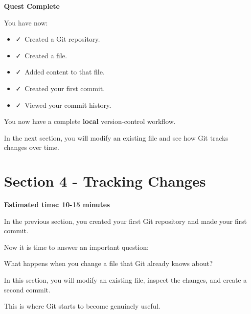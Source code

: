 \documentclass{csc2059practical}
\begin{document}
\begin{wrapupbox}
\textbf{Quest Complete}\par
\medskip

You have now:


\begin{itemize}
  \item \faCheck\ Created a Git repository.
\end{itemize}

\begin{itemize}
  \item \faCheck\ Created a file.
\end{itemize}

\begin{itemize}
  \item \faCheck\ Added content to that file.
\end{itemize}

\begin{itemize}
  \item \faCheck\ Created your first commit.
\end{itemize}

\begin{itemize}
  \item \faCheck\ Viewed your commit history.
\end{itemize}

You now have a complete \textbf{local} version-control workflow.


In the next section, you will modify an existing file and see how Git tracks changes over time.


\end{wrapupbox}

\clearpage
\section{Section 4 - Tracking Changes}
\begin{infobox}
\textbf{Estimated time: 10-15 minutes}
\end{infobox}
In the previous section, you created your first Git repository and made your first commit.

Now it is time to answer an important question:

What happens when you change a file that Git already knows about?

In this section, you will modify an existing file, inspect the changes, and create a second commit.

This is where Git starts to become genuinely useful.
\end{document}
